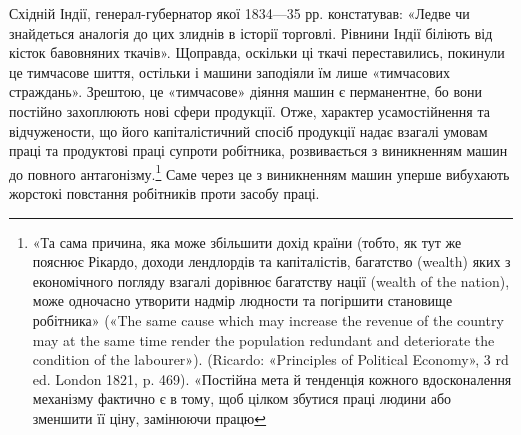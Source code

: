 Східній Індії, генерал-губернатор якої 1834—35 рр. констатував:
«Ледве чи знайдеться аналогія до цих злиднів в історії
торговлі. Рівнини Індії біліють від кісток бавовняних ткачів».
Щоправда, оскільки ці ткачі переставились, покинули це тимчасове
шиття, остільки і машини заподіяли їм лише «тимчасових
страждань». Зрештою, це «тимчасове» діяння машин є перманентне,
бо вони постійно захоплюють нові сфери продукції. Отже,
характер усамостійнення та відчужености, що його капіталістичний
спосіб продукції надає взагалі умовам праці та продуктові
праці супроти робітника, розвивається з виникненням
машин до повного антагонізму.\footnote{
«Та сама причина, яка може збільшити дохід країни (тобто, як
тут же пояснює Рікардо, доходи лендлордів та капіталістів, багатство
(wealth) яких з економічного погляду взагалі дорівнює багатству нації
(wealth of the nation), може одночасно утворити надмір людности та
погіршити становище робітника» («The same cause which may increase
the revenue of the country may at the same time render the population
redundant and deteriorate the condition of the labourer»). (Ricardo:
«Principles of Political Economy», 3 rd ed. London 1821, p. 469). «Постійна
мета й тенденція кожного вдосконалення механізму фактично є в тому,
щоб цілком збутися праці людини або зменшити її ціну, замінюючи працю
} Саме через це з виникненням
машин уперше вибухають жорстокі повстання робітників проти
засобу праці.

